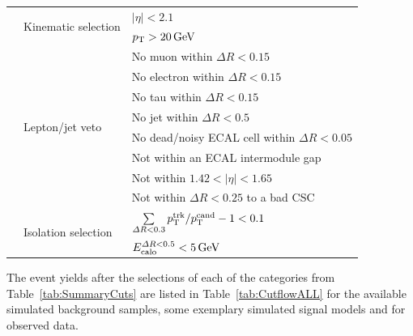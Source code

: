 \begin{table}[!h]
{\begin{tabular}{l|l|l}
                                                              &  \multirow{2}{*}{Kinematic selection}      & $|\eta|<2.1$ \\
                                                              &                                            & $p_{\text{T}}>20\,\text{Ge}\kern-0.06667em\text{V}$ \\\cmidrule{2-3}

                                                              &  \multirow{8}{*}{Lepton/jet veto}          & No muon within $\Delta R<0.15$ \\
                                                              &                                            & No electron within $\Delta R<0.15$ \\
                                                              &                                            & No tau within $\Delta R<0.15$ \\
                                                              &                                            & No jet within $\Delta R<0.5$ \\
                                                              &                                            & No dead/noisy ECAL cell within $\Delta R<0.05$  \\
                                                              &                                            & Not within an ECAL intermodule gap  \\
                                                              &                                            & Not within $1.42<|\eta|<1.65$ \\
                                                              &                                            & Not within $\Delta R<0.25$ to a bad CSC \\\cmidrule{2-3}

                                                              &  \multirow{2}{*}{Isolation selection}      & $\sum \limits_{\Delta R < 0.3} p_{\text{T}}^{\text{trk}}/p_{\text{T}}^{\text{cand}} -1  < 0.1$ \\
                                                              &                                            & $E^{\Delta R<0.5}_{\text{calo}}<5\,\text{Ge}\kern-0.06667em\text{V}$ \\


\bottomrule
\end{tabular}}
\vspace{5pt}
\end{table}
The event yields after the selections of each of the categories from Table~\ref{tab:SummaryCuts} are listed in Table~\ref{tab:CutflowALL} for the available simulated background samples, some exemplary simulated signal models and for observed data.
